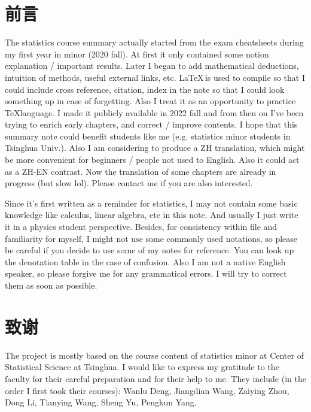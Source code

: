 {}
\chapter*{前言}

 The statistics course summary actually started from the exam cheatsheets during my first year in minor (2020 fall). At first it only contained some notion explanation / important results. Later I began to add mathematical deductions, intuition of methods, useful external links, etc. \LaTeX \,is used to compile so that I could include cross reference, citation, index in the note so that I could look something up in case of forgetting. Also I treat it as an opportunity to practice \TeX language. I made it publicly available in 2022 fall and from then on I've been trying to enrich early chapters, and correct / improve contents. I hope that this summary note could benefit students like me (e.g. statistics minor students in Tsinghua Univ.). Also I am considering to produce a ZH translation, which might be more convenient for beginners / people not used to English. Also it could act as a ZH-EN contrast. Now the translation of some chapters are already in progress (but slow lol). Please contact me if you are also interested.

Since it's first written as a reminder for statistics, I may not contain some basic knowledge like calculus, linear algebra, etc in this note. And usually I just write it in a physics student perspective. Besides, for consistency within file and familiarity for myself, I might not use some commonly used notations, so please be careful if you decide to use some of my notes for reference. You can look up the denotation table in the case of confusion. Also I am not a native English speaker, so please forgive me for any grammatical errors. I will try to correct them as soon as possible.


\newpage
{}
\chapter*{致谢}


The project is mostly based on the course content of statistics minor at Center of Statistical Science at Tsinghua. I would like to express my gratitude to the faculty for their careful preparation and for their help to me. They include (in the order I first took their courses): Wanlu Deng, Jiangdian Wang, Zaiying Zhou, Dong Li, Tianying Wang, Sheng Yu, Pengkun Yang.

